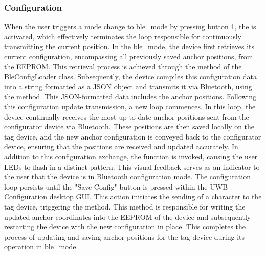 \subsubsection{Configuration}
When the user triggers a mode change to ble\_mode by pressing button 1, the  is activated, which effectively terminates the loop responsible for continuously transmitting the current position.
\vspace{4pt}
\newline
In the ble\_mode, the device first retrieves its current configuration, encompassing all previously saved anchor positions, from the EEPROM. This retrieval process is achieved through the  method of the BleConfigLoader class. 
Subsequently, the device compiles this configuration data into a string formatted as a JSON object and transmits it via Bluetooth, using the  method. 
This JSON-formatted data includes the anchor positions.
\vspace{4pt}
\newline
Following this configuration update transmission, a new loop commences. In this loop, the device continually receives the most up-to-date anchor positions sent from the configurator device via Bluetooth. 
These positions are then saved locally on the tag device, and the new anchor configuration is conveyed back to the configurator device, ensuring that the positions are received and updated accurately.
\vspace{4pt}
\newline
In addition to this configuration exchange, the  function is invoked, causing the user LEDs to flash in a distinct pattern. 
This visual feedback serves as an indicator to the user that the device is in Bluetooth configuration mode.
\vspace{4pt}
\newline
The configuration loop persists until the "Save Config" button is pressed within the UWB Configuration desktop GUI. 
This action initiates the sending of a character to the tag device, triggering the  method. 
This method is responsible for writing the updated anchor coordinates into the EEPROM of the device and subsequently restarting the device with the new configuration in place. 
This completes the process of updating and saving anchor positions for the tag device during its operation in ble\_mode.



